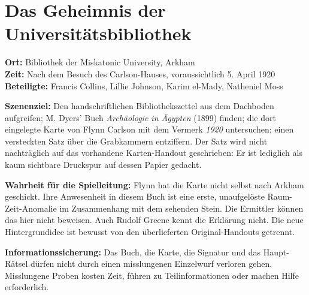\chapter{Das Geheimnis der Universitätsbibliothek}
\noindent\textbf{Ort:} Bibliothek der Miskatonic University, Arkham\\
\textbf{Zeit:} Nach dem Besuch des Carlson-Hauses, voraussichtlich 5. April 1920\\
\textbf{Beteiligte:} Francis Collins, Lillie Johnson, Karim el-Mady, Natheniel Moss

\begin{meisterinfo}
\textbf{Szenenziel:} Den handschriftlichen Bibliothekszettel aus dem Dachboden aufgreifen; M. Dyers' Buch \emph{Archäologie in Ägypten} (1899) finden; die dort eingelegte Karte von Flynn Carlson mit dem Vermerk \emph{1920} untersuchen; einen versteckten Satz über die Grabkammern entziffern. Der Satz wird nicht nachträglich auf das vorhandene Karten-Handout geschrieben: Er ist lediglich als kaum sichtbare Druckspur auf dessen Papier gedacht.

\textbf{Wahrheit für die Spielleitung:} Flynn hat die Karte nicht selbst nach Arkham geschickt. Ihre Anwesenheit in diesem Buch ist eine erste, unaufgelöste Raum-Zeit-Anomalie im Zusammenhang mit dem sehenden Stein. Die Ermittler können das hier nicht beweisen. Auch Rudolf Greene kennt die Erklärung nicht. Die neue Hintergrundidee ist bewusst von den überlieferten Original-Handouts getrennt.

\textbf{Informationssicherung:} Das Buch, die Karte, die Signatur und das Haupt-Rätsel dürfen nicht durch einen misslungenen Einzelwurf verloren gehen. Misslungene Proben kosten Zeit, führen zu Teilinformationen oder machen Hilfe erforderlich.
\end{meisterinfo}

